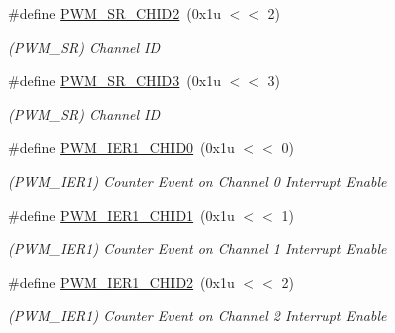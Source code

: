 \begin{DoxyCompactItemize}
\#define \mbox{\hyperlink{group__SAMV71__PWM_gad0340aa3419df5dd39b9cd56c4b98862}{P\+W\+M\+\_\+\+S\+R\+\_\+\+C\+H\+I\+D2}}~(0x1u $<$$<$ 2)
\begin{DoxyCompactList}\small\item\em (P\+W\+M\+\_\+\+SR) Channel ID \end{DoxyCompactList}\item 
\mbox{\label{group__SAMV71__PWM_gab8c704ff17cd4890571f8794c0ae0ecc}} 
\#define \mbox{\hyperlink{group__SAMV71__PWM_gab8c704ff17cd4890571f8794c0ae0ecc}{P\+W\+M\+\_\+\+S\+R\+\_\+\+C\+H\+I\+D3}}~(0x1u $<$$<$ 3)
\begin{DoxyCompactList}\small\item\em (P\+W\+M\+\_\+\+SR) Channel ID \end{DoxyCompactList}\item 
\mbox{\label{group__SAMV71__PWM_gacec10dad8055a8b5b3c7d901efc11c44}} 
\#define \mbox{\hyperlink{group__SAMV71__PWM_gacec10dad8055a8b5b3c7d901efc11c44}{P\+W\+M\+\_\+\+I\+E\+R1\+\_\+\+C\+H\+I\+D0}}~(0x1u $<$$<$ 0)
\begin{DoxyCompactList}\small\item\em (P\+W\+M\+\_\+\+I\+E\+R1) Counter Event on Channel 0 Interrupt Enable \end{DoxyCompactList}\item 
\mbox{\label{group__SAMV71__PWM_gadf1bd2e8c79a879b4137063f1c78db41}} 
\#define \mbox{\hyperlink{group__SAMV71__PWM_gadf1bd2e8c79a879b4137063f1c78db41}{P\+W\+M\+\_\+\+I\+E\+R1\+\_\+\+C\+H\+I\+D1}}~(0x1u $<$$<$ 1)
\begin{DoxyCompactList}\small\item\em (P\+W\+M\+\_\+\+I\+E\+R1) Counter Event on Channel 1 Interrupt Enable \end{DoxyCompactList}\item 
\mbox{\label{group__SAMV71__PWM_gaa396fa0bb6991b994c66401939fdabc8}} 
\#define \mbox{\hyperlink{group__SAMV71__PWM_gaa396fa0bb6991b994c66401939fdabc8}{P\+W\+M\+\_\+\+I\+E\+R1\+\_\+\+C\+H\+I\+D2}}~(0x1u $<$$<$ 2)
\begin{DoxyCompactList}\small\item\em (P\+W\+M\+\_\+\+I\+E\+R1) Counter Event on Channel 2 Interrupt Enable \end{DoxyCompactList}\item 
$$
\end{DoxyCompactItemize}
